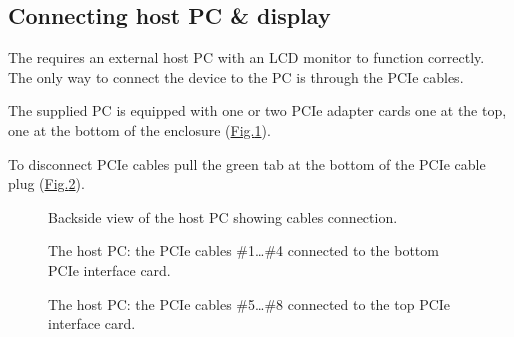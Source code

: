 \documentclass[letterpaper,10pt,english]{sphinxmanual}
\begin{document}
\subsection{Connecting host PC \& display}
\label{\detokenize{content/hardware:connecting-host-pc-display}}
\sphinxAtStartPar
The  requires an external host PC with an LCD monitor to function correctly. The only way to connect the  device to the PC is through the PCIe cables.

\sphinxAtStartPar
The supplied PC is equipped with one or two PCIe adapter cards \textendash{} one at the top, one at the bottom of the enclosure (\hyperref[\detokenize{content/hardware:pc-back-cables}]{Fig.\@ \ref{\detokenize{content/hardware:pc-back-cables}}}).

\sphinxAtStartPar
To disconnect PCIe cables pull the green tab at the bottom of the PCIe cable plug (\hyperref[\detokenize{content/hardware:pc-pcie-cables}]{Fig.\@ \ref{\detokenize{content/hardware:pc-pcie-cables}}}).

\begin{figure}[htbp]
\centering
\capstart

\noindent{}
\caption{Back\sphinxhyphen{}side view of the host PC showing cables connection.}\label{\detokenize{content/hardware:pc-back-cables}}\end{figure}

\begin{figure}[htbp]
\centering
\capstart

\noindent{}
\caption{The host PC: the PCIe cables \#1…\#4 connected to the bottom PCIe interface card.}\label{\detokenize{content/hardware:pc-pcie-cables}}\end{figure}

\begin{figure}[htbp]
\centering
\capstart

\noindent{}
\caption{The host PC: the PCIe cables \#5…\#8 connected to the top PCIe interface card.}\label{\detokenize{content/hardware:pcie-cables-5678}}\end{figure}
\end{document}
